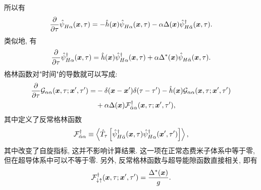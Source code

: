 所以有 
\begin{equation}
    \frac{\partial}{\partial\tau}\hat{\psi}_{H\alpha}^{ }(\boldsymbol{x},\tau)=-\hat{h}(\boldsymbol{x})\hat{\psi}_{H\alpha}^{ }(\boldsymbol{x},\tau)-\alpha\Delta(\boldsymbol{x})\hat{\psi}_{H\bar{\alpha}}^\dagger(\boldsymbol{x},\tau).
\end{equation}
类似地, 有
\begin{equation}
    \frac{\partial}{\partial\tau}\hat{\psi}_{H\alpha}^\dagger (\boldsymbol{x},\tau)=\hat{h}(\boldsymbol{x})\hat{\psi}_{H\alpha}^\dagger (\boldsymbol{x},\tau)+\alpha\Delta^*(\boldsymbol{x})\hat{\psi}_{H\bar\alpha}^{ }(\boldsymbol{x},\tau).
\end{equation}
格林函数对"时间"的导数就可以写成: 
  \begin{align}
        \frac{\partial}{\partial \tau}\mathcal{G}_{\alpha\alpha}(\boldsymbol{x},\tau;\boldsymbol{x}',\tau')=&-\delta(\boldsymbol{x}-\boldsymbol{x}')\delta(\tau-\tau')-\hat{h}(\boldsymbol{x})\mathcal{G}_{\alpha\alpha}(\boldsymbol{x},\tau;\boldsymbol{x}',\tau')\nonumber\\
&+\alpha \Delta(\boldsymbol{x})\mathcal{F}_{\bar{\alpha}\alpha}^{\dagger}(\boldsymbol{x},\tau;\boldsymbol{x}',\tau'),
    \end{align}
其中定义了反常格林函数 
\begin{equation}
    \mathcal{F}_{\bar{\alpha}\alpha}^\dagger\equiv \left\langle \hat{T}_\tau \left[ \hat{\psi}_{H\bar \alpha}^\dagger(\boldsymbol{x},\tau)\hat{\psi}_{H\alpha}^\dagger(\boldsymbol{x}',\tau') \right] \right\rangle,
\end{equation}
其中改变了自旋指标, 这并不影响计算结果. 这一项在正常态费米子体系中等于零, 但在超导体系中可以不等于零. 另外, 反常格林函数与超导能隙函数直接相关, 即有 
\begin{equation}
    \mathcal{F}_{\downarrow\uparrow}^\dagger(\boldsymbol{x},\tau;\boldsymbol{x}',\tau')=\frac{\Delta^*(\boldsymbol{x})}{g}.
\end{equation}

